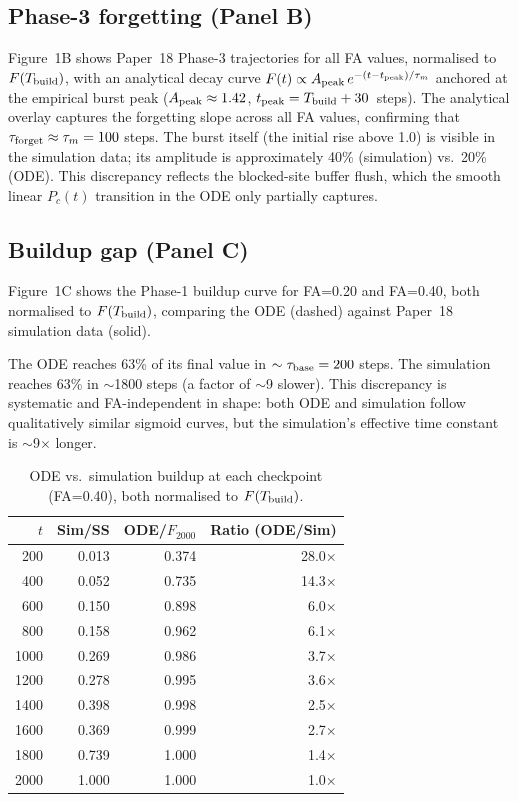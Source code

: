\documentclass[11pt]{article}
\begin{document}
\subsection{Phase-3 forgetting (Panel B)}

Figure~1B shows Paper~18 Phase-3 trajectories for all FA values, normalised to $F(T_{\rm build})$,
with an analytical decay curve $F(t) \propto A_{\rm peak}\,e^{-(t-t_{\rm peak})/\tau_m}$
anchored at the empirical burst peak ($A_{\rm peak} \approx 1.42$, $t_{\rm peak} = T_{\rm build} + 30$~steps).
The analytical overlay captures the forgetting slope across all FA values,
confirming that $\tau_{\rm forget} \approx \tau_m = 100$ steps.
The burst itself (the initial rise above 1.0) is visible in the simulation data;
its amplitude is approximately 40\% (simulation) vs.\ 20\% (ODE).
This discrepancy reflects the blocked-site buffer flush, which the smooth linear
$P_c(t)$ transition in the ODE only partially captures.

\subsection{Buildup gap (Panel C)}

Figure~1C shows the Phase-1 buildup curve for FA=0.20 and FA=0.40,
both normalised to $F(T_{\rm build})$, comparing the ODE (dashed) against Paper~18
simulation data (solid).

The ODE reaches 63\% of its final value in $\sim\tau_{\rm base} = 200$ steps.
The simulation reaches 63\% in $\sim$1800 steps (a factor of $\sim$9 slower).
This discrepancy is systematic and FA-independent in shape:
both ODE and simulation follow qualitatively similar sigmoid curves,
but the simulation's effective time constant is $\sim$9$\times$ longer.

\begin{table}[ht]
\centering
\caption{ODE vs.\ simulation buildup at each checkpoint (FA=0.40), both normalised to $F(T_{\rm build})$.}
\label{tab:gap}
\begin{tabular}{rrrr}
\toprule
$t$ & Sim/SS & ODE/$F_{2000}$ & Ratio (ODE/Sim) \\
\midrule
 200 & 0.013 & 0.374 & 28.0$\times$ \\
 400 & 0.052 & 0.735 & 14.3$\times$ \\
 600 & 0.150 & 0.898 &  6.0$\times$ \\
 800 & 0.158 & 0.962 &  6.1$\times$ \\
1000 & 0.269 & 0.986 &  3.7$\times$ \\
1200 & 0.278 & 0.995 &  3.6$\times$ \\
1400 & 0.398 & 0.998 &  2.5$\times$ \\
1600 & 0.369 & 0.999 &  2.7$\times$ \\
1800 & 0.739 & 1.000 &  1.4$\times$ \\
2000 & 1.000 & 1.000 &  1.0$\times$ \\
\bottomrule
\end{tabular}
\end{table}
\end{document}
